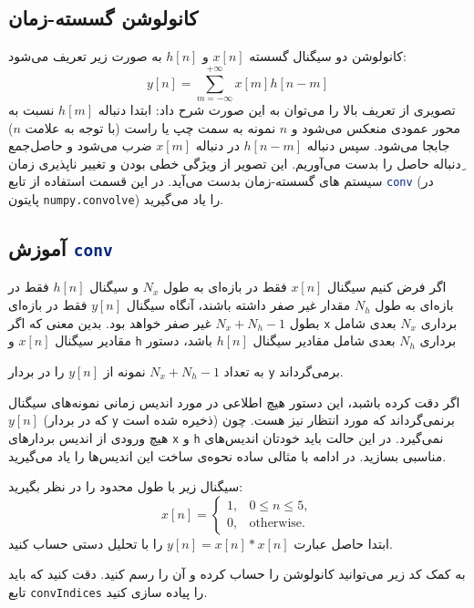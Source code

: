 \documentclass{utsignal}
\begin{document}
	\subsection{کانولوشن گسسته-زمان}
	کانولوشن دو سیگنال گسسته $x[n]$ و $h[n]$ به صورت زیر تعریف می‌شود:
	$$y[n]=\sum_{m=-\infty}^{+\infty} x[m]h[n-m]$$
	تصویری از تعریف بالا را می‌توان به این صورت شرح داد: ابتدا دنباله  $h[m]$ نسبت به محور عمودی منعکس می‌شود و  $n$ نمونه به سمت چپ یا راست (با توجه به علامت $n$) جابجا می‌شود. سپس دنباله  $h[n-m]$ در دنباله  $x[m]$ ضرب می‌شود و حاصل‌جمع ِدنباله حاصل را بدست می‌آوریم. این تصویر از ویژگی خطی بودن و تغییر ناپذیری زمان سیستم های گسسته-زمان بدست می‌آید. در این قسمت استفاده از تابع \lstinline[language=Octave]{conv} (در پایتون \lstinline[language=Python]{numpy.convolve}) را یاد می‌گیرید.
	\subsection{آموزش \lstinline[language=Octave]{conv}}
	اگر فرض کنیم سیگنال $x[n]$ فقط در بازه‌ای به طول $N_x$ و سیگنال $h[n]$ فقط در بازه‌ای به طول $N_h$ مقدار غیر صفر داشته باشند، آنگاه سیگنال $y[n]$ فقط در بازه‌ای بطول $N_x+N_h-1$ غیر صفر خواهد بود. بدین معنی که اگر  \lstinline[language=Octave]{x} برداری $N_x$ بعدی شامل مقادیر سیگنال  $x[n]$ و \lstinline[language=Octave]{h} برداری $N_h$ بعدی شامل مقادیر سیگنال $h[n]$ باشد، دستور 
	\begin{latin}
		
	\end{latin}
	\noindent به تعداد $N_x+N_h-1$ نمونه از $y[n]$ را در بردار \lstinline[language=Octave]{y} برمی‌گرداند.
	
	اگر دقت کرده باشبد، این دستور هیچ اطلاعی در مورد اندیس زمانی نمونه‌های سیگنال $y[n]$ (که در بردار \lstinline[language=Octave]{y} ذخیره شده است) برنمی‌گرداند که مورد انتظار نیز هست. چون هیچ ورودی از اندیس بردارهای \lstinline[language=Octave]{x} و \lstinline[language=Octave]{h} نمی‌گیرد. در این حالت باید خودتان اندیس‌‌های مناسبی بسازید. در ادامه با مثالی ساده نحوه‌ی ساخت این اندیس‌ها را یاد می‌گیرید.
	
	سیگنال زیر با طول محدود را در نظر بگیرید:
	$$
	x[n]=\begin{cases}
		1, & 0 \le n \le 5,\\
		0, & \text{otherwise}.
	\end{cases}
	$$
	ابتدا حاصل عبارت $y[n]=x[n]*x[n]$ را با تحلیل دستی حساب کنید.
	
	به کمک کد زیر می‌توانید کانولوشن را حساب کرده و آن را رسم کنید. دقت کنید که باید تابع \lstinline[language=Octave]{convIndices} را پیاده سازی کنید.
	\begin{latin}
		
	\end{latin}
	
\end{document}
